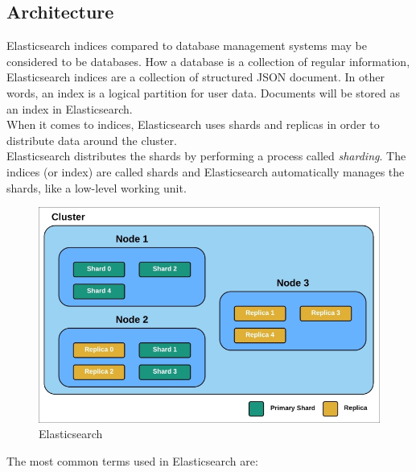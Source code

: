 \subsection{Architecture~\cite{elastic3}}
Elasticsearch indices compared to database management systems may be considered to be databases. How a database is a collection of regular information, Elasticsearch indices are a collection of structured JSON document. In other words, an index is a logical partition for user data. Documents will be stored as an index in Elasticsearch.\\
When it comes to indices, Elasticsearch uses shards and replicas in order to distribute data around the cluster.\\
Elasticsearch distributes the shards by performing a process called \textit{sharding}. The indices (or index) are called shards and Elasticsearch automatically manages the shards, like a low-level working unit.
\begin{figure}
	\includegraphics[width=\linewidth]{img/elasticsearch.jpeg}
	\caption{Elasticsearch~\cite{elastic3}}
	\label{fig:elastic1}
\end{figure}
The most common terms used in Elasticsearch are:
